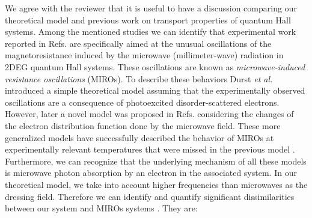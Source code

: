 \documentclass{article}
\begin{document}
We agree with the reviewer that it is useful to have a discussion comparing  our theoretical model and previous work on transport properties of quantum Hall systems.
Among the mentioned studies we can identify that experimental work reported in Refs. \cite{zudov01,mani02,zudov03,mani04} are specifically aimed at the unusual oscillations of the magnetoresistance induced by the microwave (millimeter-wave) radiation in 2DEG quantum Hall systems.
These oscillations are known as \textit{microwave-induced resistance oscillations} (MIROs).
To describe these behaviors Durst \textit{et al.} \cite{durst03} introduced a simple theoretical model assuming that the experimentally observed oscillations are a consequence of photoexcited disorder-scattered electrons.
However, later a novel model was proposed in Refs. \cite{dmitriev03,dmitriev05,dmitriev09} considering the changes of the electron distribution function done by the microwave field.
These more generalized models \cite{dmitriev03,dmitriev05,dmitriev09} have successfully described the behavior of MIROs at experimentally relevant temperatures that were missed in the previous model \cite{durst03}.
Furthermore, we can recognize that the underlying mechanism of all these models \cite{durst03,dmitriev03,dmitriev05,dmitriev09} is microwave photon absorption by an electron in the associated system. In our theoretical model, we take into account higher frequencies than microwaves as the dressing field.
Therefore we can identify and quantify significant dissimilarities between our system and MIROs systems \cite{zudov01,mani02,zudov03,mani04,durst03,dmitriev03,dmitriev05,dmitriev09}. They are:
\end{document}

